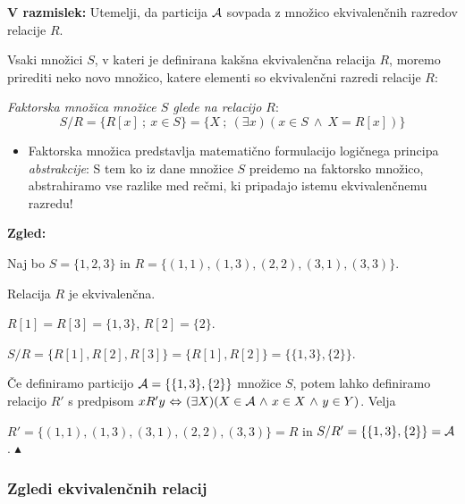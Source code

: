 \documentclass[11pt,paper=b5,footinclude,headinclude]{scrbook} %
\def\inn {{~\wedge~}}
\def\cee {{~\Leftrightarrow~}}
\def\zgled{\noindent\textbf{\color{blue} Zgled: }}
\def\kz{{\hfill{\color{blue}$\blacktriangle$}}}%
\begin{document}
\textbf{ V razmislek:} Utemelji, da particija ${\cal A}$ sovpada z množico ekvivalenčnih razredov relacije $R$.

%
%
%
%

%
%
%
%
%
%
%
%
\medskip



Vsaki množici $S$, v kateri je definirana kakšna ekvivalenčna relacija $R$, moremo prirediti neko novo množico, katere elementi so ekvivalenčni razredi relacije $R$:

{\em Faktorska množica množice $S$ glede na relacijo $R$}:
$$S/R = \{R[x]~;~x\in S\}=\{X~;~(\exists x)(x\in S \inn X = R[x])\}$$
\begin{itemize}
  \item Faktorska množica predstavlja matematično formulacijo logičnega principa {\em abstrakcije}: S tem ko iz dane množice $S$ preidemo na faktorsko množico, abstrahiramo vse razlike med rečmi, ki pripadajo istemu ekvivalenčnemu razredu!
\end{itemize}


\bigskip
\zgled

Naj bo $S = \{1,2,3\}$ in $R = \{(1,1),(1,3),(2,2),(3,1),(3,3)\}$.

Relacija $R$ je ekvivalenčna.

$R[1] = R[3] = \{1,3\}$, $R[2] = \{2\}$.

$S/R =  \{R[1], R[2],R[3]\} = \{R[1], R[2]\} = \{\{1,3\},\{2\}\}$.

\v Ce definiramo particijo ${\cal A} = \{\{1,3\},\{2\}\}$ množice $S$, potem lahko definiramo relacijo $R'$ s predpisom
$xR'y \cee (\exists X)(X\in {\cal A}\inn x\in X\inn y\in Y)$.
Velja

$R' = \{(1,1),(1,3),(3,1),(2,2),(3,3)\} = R$
in $S/R' = \{\{1,3\},\{2\}\} = {\cal A}$.
\kz


\subsubsection*{Zgledi ekvivalenčnih relacij}
\end{document}
